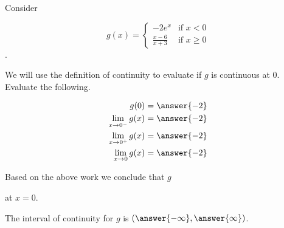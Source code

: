 \documentclass{ximera}
\author{Nela Lakos \and Kyle Parsons}
\begin{document}
\begin{exercise}

Consider

\[
g(x) = 
\begin{cases}
-2e^x & \text{if }x<0\\
\frac{x-6}{x+3} & \text{if }x\geq0
\end{cases}
\].

We will use the definition of continuity to evaluate if $g$ is continuous at 0.  Evaluate the following.

\begin{align*}
g(0) &= \answer{-2}\\
\lim_{x\to0^-}g(x) &= \answer{-2}\\
\lim_{x\to0^+}g(x) &= \answer{-2}\\
\lim_{x\to0}g(x) &= \answer{-2}
\end{align*}

\begin{exercise}

Based on the above work we conclude that $g$
\begin{multipleChoice}
\end{multipleChoice}
at $x=0$.

\begin{exercise}

The interval of continuity for $g$ is $\left(\answer{-\infty},\answer{\infty}\right)$.

\end{exercise}
\end{exercise}
\end{exercise}
\end{document}
